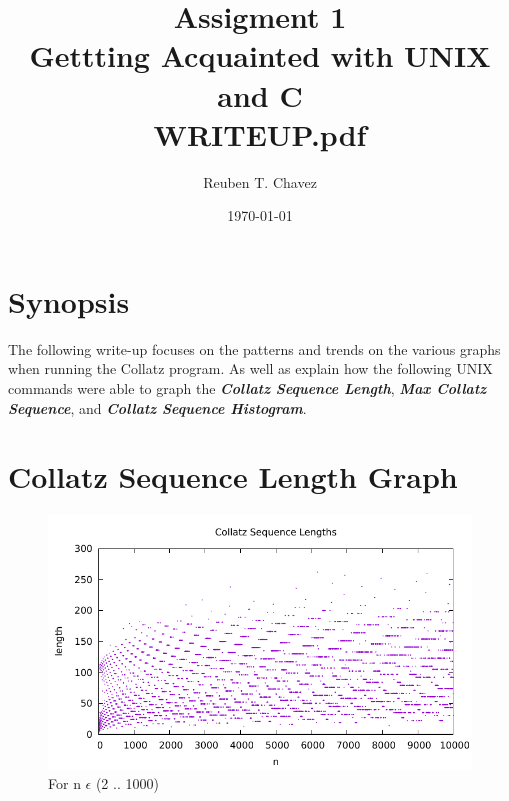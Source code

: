 \documentclass[11pt]{article} %
\title{Assigment 1 \\
    \large Gettting Acquainted with UNIX and C \\
     \textbf{WRITEUP.pdf}}
\author{Reuben T. Chavez}
\date{\today} %
\begin{document}
\maketitle %



\pagebreak

\section*{Synopsis}
The following write-up focuses on the patterns and trends on the various
graphs when running the Collatz program. As well as explain how the
following UNIX commands were able to graph the \textbf{\emph{Collatz Sequence Length}}, \textbf{\emph{
Max Collatz Sequence}}, and \textbf{\emph{ Collatz Sequence Histogram}}. 

\pagebreak
\section*{Collatz Sequence Length Graph}

\begin{figure}[htp]
\centering
\includegraphics[scale=1.00]{length.pdf}
\caption{For n $ \epsilon $ (2 .. 1000)}
\label{Collatz Sequence Length}
\end{figure}
\end{document}
